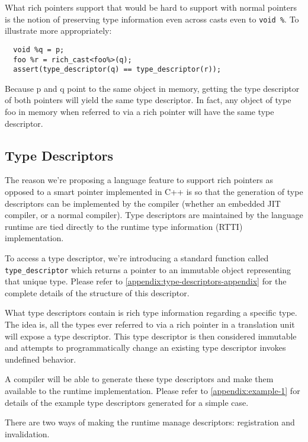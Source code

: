 \documentclass[10pt,a4paper]{article}
\begin{document}
What rich pointers support that would be hard to support with normal pointers is
the notion of preserving type information even across casts even to
\verb+void %+. To illustrate more appropriately:

\begin{verbatim}
  void %q = p;
  foo %r = rich_cast<foo%>(q);
  assert(type_descriptor(q) == type_descriptor(r));
\end{verbatim}

Because p and q point to the same object in memory, getting the type descriptor
of both pointers will yield the same type descriptor. In fact, any object of
type foo in memory when referred to via a rich pointer will have the same type
descriptor.

\subsection{Type Descriptors}

The reason we’re proposing a language feature to support rich pointers as
opposed to a smart pointer implemented in C++ is so that the generation of type
descriptors can be implemented by the compiler (whether an embedded JIT
compiler, or a normal compiler). Type descriptors are maintained by the language
runtime are tied directly to the runtime type information (RTTI) implementation.

To access a type descriptor, we’re introducing a standard function called \\
\verb+type_descriptor+ which returns a pointer to an immutable object
representing that unique type. Please refer to
\autoref{appendix:type-descriptors-appendix} for the complete details of the
structure of this descriptor.

What type descriptors contain is rich type information regarding a specific
type. The idea is, all the types ever referred to via a rich pointer in a
translation unit will expose a type descriptor. This type descriptor is then
considered immutable and attempts to programmatically change an existing type
descriptor invokes undefined behavior.

A compiler will be able to generate these type descriptors and make them
available to the runtime implementation. Please refer to
\autoref{appendix:example-1} for details of the example type descriptors
generated for a simple case.

There are two ways of making the runtime manage descriptors: registration and
invalidation.
\end{document}
